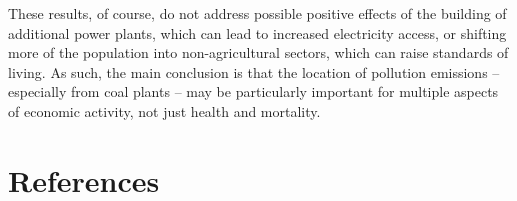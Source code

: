 \documentclass[
]{article}
\begin{document}
These results, of course, do not address possible positive effects of the building of additional power plants, which can lead to increased electricity access, or shifting more of the population into non-agricultural sectors, which can raise standards of living. As such, the main conclusion is that the location of pollution emissions -- especially from coal plants -- may be particularly important for multiple aspects of economic activity, not just health and mortality.

\FloatBarrier
\newpage
\singlespacing

\hypertarget{references}{%
\section*{References}\label{references}}
\end{document}
